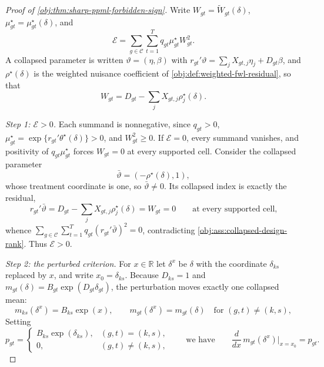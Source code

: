 \documentclass[11pt]{article}
\begin{document}
\begin{proof}[Proof of \cref{obj:thm:sharp-ppml-forbidden-sign}]
Write \(W_{gt}=\widetilde W_{gt}(\delta)\), \(\mu^\star_{gt}=\mu^\star_{gt}(\delta)\), and
\[
\mathcal E=\sum_{g\in\mathcal C}\sum_{t=1}^T q_{gt}\mu^\star_{gt}W_{gt}^2 .
\]
A collapsed parameter is written \(\vartheta=(\eta,\beta)\) with \(r_{gt}'\vartheta=\sum_jX_{gt,j}\eta_j+D_{gt}\beta\), and \(\rho^\star(\delta)\) is the weighted nuisance coefficient of \cref{obj:def:weighted-fwl-residual}, so that
\[
W_{gt}=D_{gt}-\sum_jX_{gt,j}\rho^\star_j(\delta).
\]

\textit{Step 1: \(\mathcal E>0\).} Each summand is nonnegative, since \(q_{gt}>0\), \(\mu^\star_{gt}=\exp\{r_{gt}'\theta^\star(\delta)\}>0\), and \(W_{gt}^2\ge0\). If \(\mathcal E=0\), every summand vanishes, and positivity of \(q_{gt}\mu^\star_{gt}\) forces \(W_{gt}=0\) at every supported cell. Consider the collapsed parameter
\[
\bar\vartheta=(-\rho^\star(\delta),1),
\]
whose treatment coordinate is one, so \(\bar\vartheta\neq0\). Its collapsed index is exactly the residual,
\[
r_{gt}'\bar\vartheta=D_{gt}-\sum_jX_{gt,j}\rho^\star_j(\delta)=W_{gt}=0
\qquad\text{at every supported cell,}
\]
whence \(\sum_{g\in\mathcal C}\sum_{t=1}^T q_{gt}(r_{gt}'\bar\vartheta)^2=0\), contradicting \cref{obj:ass:collapsed-design-rank}. Thus \(\mathcal E>0\).

\textit{Step 2: the perturbed criterion.} For \(x\in\mathbb R\) let \(\delta^x\) be \(\delta\) with the coordinate \(\delta_{ks}\) replaced by \(x\), and write \(x_0=\delta_{ks}\). Because \(D_{ks}=1\) and \(m_{gt}(\delta)=B_{gt}\exp(D_{gt}\delta_{gt})\), the perturbation moves exactly one collapsed mean:
\[
m_{ks}(\delta^x)=B_{ks}\exp(x),
\qquad
m_{gt}(\delta^x)=m_{gt}(\delta)\quad\text{for }(g,t)\neq(k,s),
\]
Setting
\[
p_{gt}=
\begin{cases}
B_{ks}\exp(\delta_{ks}), & (g,t)=(k,s),\\
0, & (g,t)\neq(k,s),
\end{cases}
\qquad\text{we have}\qquad
\frac{d}{dx}\,m_{gt}(\delta^x)\Big|_{x=x_0}=p_{gt}.
\]


\end{proof}
\end{document}
